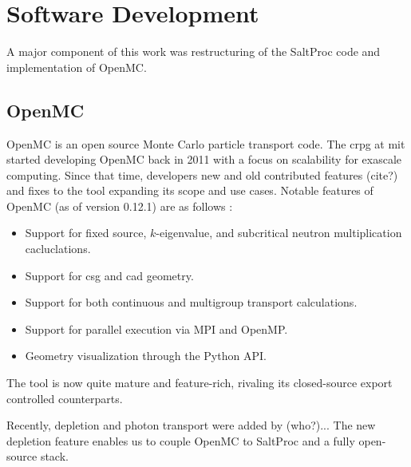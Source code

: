 \chapter{Software Development}%
\label{cha:software_development}

A major component of this work was restructuring of the SaltProc code and implementation of OpenMC.

\section{OpenMC}%
\label{sec:openmc}

OpenMC \cite{romano_openmc_2015} is an open source Monte Carlo particle transport code. The \Gls{crpg} at \Gls{mit} started developing OpenMC back in 2011 with a focus on scalability for exascale computing. Since that time, developers new and old contributed features (cite?) and fixes to the tool expanding its scope and use cases. Notable features of OpenMC (as of version 0.12.1) are as follows \cite{openmc_homepage}:
\begin{itemize}
    \item Support for fixed source, $k$-eigenvalue, and subcritical neutron multiplication cacluclations.
    \item Support for \Gls{csg} and \Gls{cad} geometry.
    \item Support for both continuous and multigroup transport calculations.
    \item Support for parallel execution via MPI and OpenMP.
    \item Geometry visualization through the Python API.
\end{itemize}
The tool is now quite mature and feature-rich, rivaling its closed-source export controlled counterparts. 


Recently, depletion and photon transport were added by (who?)... The new depletion feature enables us to couple OpenMC to SaltProc and a fully open-source stack.
